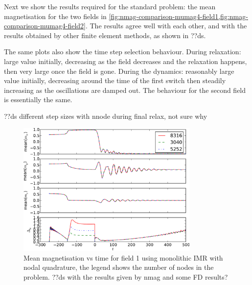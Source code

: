 Next we show the results required for the standard problem: the mean magnetisation for the two fields in \cref{fig:nmag-comparison-mumag4-field1,fig:nmag-comparison-mumag4-field2}.
The results agree well with each other, and with the results obtained by other finite element methods, as shown in ??ds.

The same plots also show the time step selection behaviour.
During relaxation: large value initially, decreasing as the field decreases and the relaxation happens, then very large once the field is gone.
During the dynamics: reasonably large value initially, decreasing around the time of the first switch then steadily increasing as the oscillations are damped out.
The behaviour for the second field is essentially the same.

??ds different step sizes with nnode during final relax, not sure why

\begin{figure}
  \centering
  \includegraphics[width=0.8\textwidth]{plots/mumag4_convergence/mumag4_field1-meanmxsvs-meanmysvs-meanmzsvs-dtsvstimes.pdf}
  \caption{Mean magnetisation vs time for field 1 using monolithic IMR with nodal quadrature, the legend shows the number of nodes in the problem.
    ??ds with the results given by nmag and some FD results?}
  \label{fig:nmag-comparison-mumag4-field1}
\end{figure}

